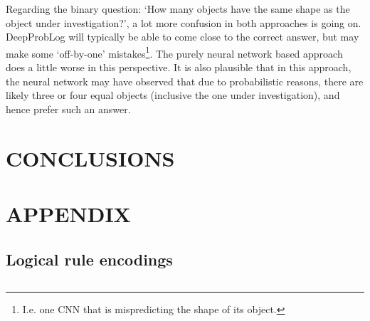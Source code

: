 \documentclass[english]{sobraep}
\begin{document}
Regarding the binary question: `How many objects have the same shape as the object under investigation?', a lot more confusion in both approaches is going on. DeepProbLog will typically be able to come close to the correct answer, but may make some `off-by-one' mistakes\footnote{I.e. one CNN that is mispredicting the shape of its object.}. The purely neural network based approach does a little worse in this perspective. It is also plausible that in this approach, the neural network may have observed that due to probabilistic reasons, there are likely three or four equal objects (inclusive the one under investigation), and hence prefer such an answer.

\section{CONCLUSIONS}
\label{sec:conclusions}


 

\section*{APPENDIX}
\subsection{Logical rule encodings}
\label{appendix:logical_rule_encodings}
\inputminted[breaklines]{prolog}{"/home/jorrit/Data/KU Leuven/Semester 12/Capita Selecta H05N0a/deepproblog/src/deepproblog/examples/SORTOFCLEVR/model.pl"}

\end{document}
